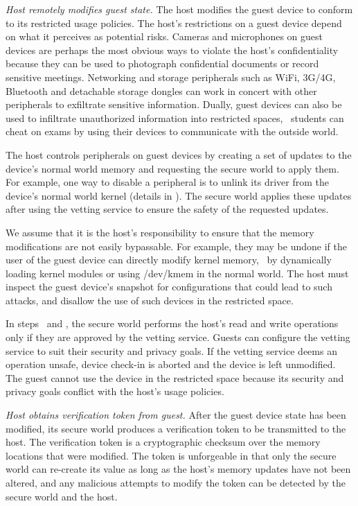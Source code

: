 \begin{mylist}
\item \textit{Host remotely modifies guest state.} The host modifies the guest
device to conform to its restricted usage policies.  The host's restrictions on
a guest device depend on what it perceives as potential risks.  Cameras and
microphones on guest devices are perhaps the most obvious ways to violate the
host's confidentiality because they can be used to photograph confidential
documents or record sensitive meetings. Networking and storage peripherals such
as WiFi, 3G/4G, Bluetooth and detachable storage dongles can work in concert
with other peripherals to exfiltrate sensitive information. Dually, guest
devices can also be used to infiltrate unauthorized information into restricted
spaces, \eg~students can cheat on exams by using their devices to communicate
with the outside world.

The host controls peripherals on guest devices by creating a set of updates to
the device's normal world memory and requesting the secure world to apply them.
For example, one way to disable a peripheral is to unlink its driver from the
device's normal world kernel (details in ).  The secure
world applies these updates after using the vetting service to ensure the
safety of the requested updates.

We assume that it is the host's responsibility to ensure that the memory
modifications are not easily bypassable. For example, they may be undone if the
user of the guest device can directly modify kernel memory, \eg~by dynamically
loading kernel modules or using \textsf{/dev/kmem} in the normal world. The
host must inspect the guest device's snapshot for configurations that could
lead to such attacks, and disallow the use of such devices in the restricted
space.

In steps \circtwo\ and \circthree, the secure world performs the host's read
and write operations only if they are approved by the vetting service. Guests
can configure the vetting service to suit their security and privacy goals. If
the vetting service deems an operation unsafe, device check-in is aborted and
the device is left unmodified. The guest cannot use the device in the
restricted space because its security and privacy goals conflict with the
host's usage policies.

\item \textit{Host obtains verification token from guest.} After the guest
device state has been modified, its secure world produces a verification token
to be transmitted to the host. The verification token is a cryptographic
checksum over the memory locations that were modified. The token is unforgeable
in that only the secure world can re-create its value as long as the host's
memory updates have not been altered, and any malicious attempts to modify the
token can be detected by the secure world and the host.


\end{mylist}
